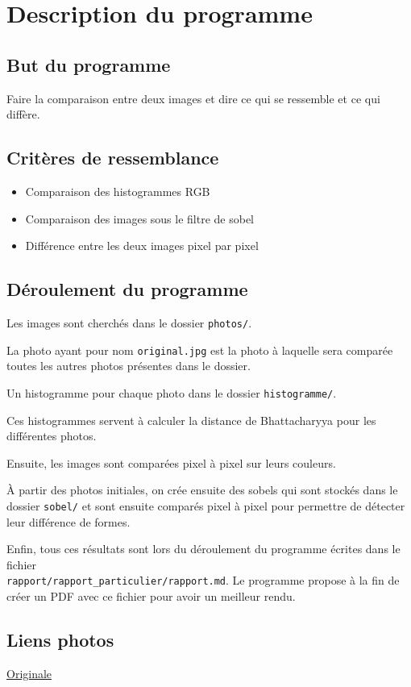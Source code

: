 \section{Description du programme}
\subsection{But du programme}\label{but-du-programme}

Faire la comparaison entre deux images et dire ce qui se ressemble et ce
qui diffère.

\subsection{Critères de ressemblance}\label{crituxe8res-de-ressemblance}

\begin{itemize}
\itemsep1pt\parskip0pt
\item
  Comparaison des histogrammes RGB
\item
  Comparaison des images sous le filtre de sobel
\item
  Différence entre les deux images pixel par pixel
\end{itemize}

\subsection{Déroulement du programme}\label{duxe9roulement-du-programme}

Les images sont cherchés dans le dossier \texttt{photos/}.

La photo ayant pour nom \texttt{original.jpg} est la photo à laquelle
sera comparée toutes les autres photos présentes dans le dossier.

Un histogramme pour chaque photo dans le dossier \texttt{histogramme/}.

Ces histogrammes servent à calculer la distance de Bhattacharyya pour
les différentes photos.

Ensuite, les images sont comparées pixel à pixel sur leurs couleurs.

À partir des photos initiales, on crée ensuite des sobels qui sont
stockés dans le dossier \texttt{sobel/} et sont ensuite comparés pixel à
pixel pour permettre de détecter leur différence de formes.

Enfin, tous ces résultats sont lors du déroulement du programme écrites
dans le fichier \\
\texttt{rapport/rapport\_particulier/rapport.md}. Le
programme propose à la fin de créer un PDF avec ce fichier pour avoir un
meilleur rendu.

\subsection{Liens photos}\label{liens-photos}

\href{http://farm9.static.flickr.com/8329/8086409595_92b9bb908a_b.jpg}{Originale}
